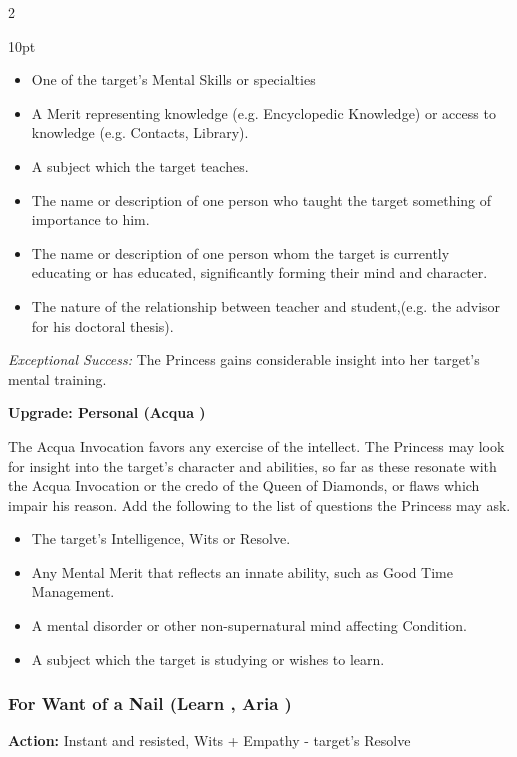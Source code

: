 \begin{multicols}{2}
\begin{myindentpar}{10pt}
\begin{itemize}
 \item One of the target's Mental Skills or specialties
 \item A Merit representing knowledge (e.g. Encyclopedic Knowledge) or access to knowledge (e.g. Contacts, Library).
 \item A subject which the target teaches. 
 \item The name or description of one person who taught the target something of importance to him. 
 \item The name or description of one person whom the target is currently educating or has educated, significantly forming their mind and character.
 \item The nature of the relationship between teacher and student,(e.g. the advisor for his doctoral thesis).
\end{itemize}

\emph{Exceptional Success:} The Princess gains considerable insight into her target's mental training.

\textbf{Upgrade: Personal (Acqua \textbullet\textbullet)}

The Acqua Invocation favors any exercise of the intellect. The Princess may look for insight into the target's character and abilities, so far as these resonate with the Acqua Invocation or the credo of the Queen of Diamonds, or flaws which impair his reason. Add the following to the list of questions the Princess may ask.\end{myindentpar}

\begin{itemize}
\item The target's Intelligence, Wits or Resolve.
\item Any Mental Merit that reflects an innate ability, such as Good Time Management.
\item A mental disorder or other non-supernatural mind affecting Condition. 
\item A subject which the target is studying or wishes to learn. 
\end{itemize}


\subsubsection*{For Want of a Nail (Learn \textbullet\textbullet, Aria \textbullet)}

\noindent \textbf{Action:} Instant and resisted, Wits + Empathy - target's Resolve


\end{multicols}
